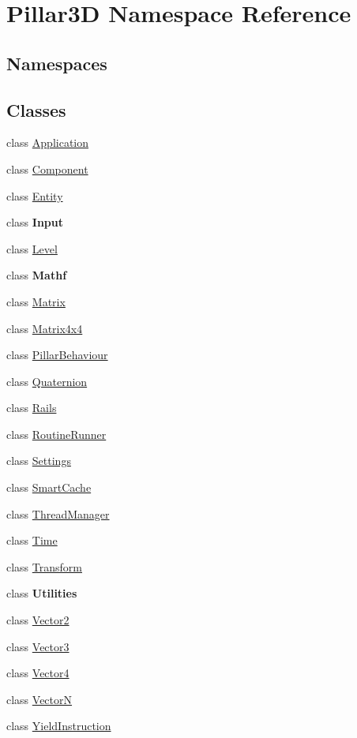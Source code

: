 \hypertarget{namespace_pillar3_d}{}\section{Pillar3D Namespace Reference}
\label{namespace_pillar3_d}
\subsection*{Namespaces}
\begin{DoxyCompactItemize}
\end{DoxyCompactItemize}
\subsection*{Classes}
\begin{DoxyCompactItemize}
\item 
class \hyperlink{class_pillar3_d_1_1_application}{Application}
\item 
class \hyperlink{class_pillar3_d_1_1_component}{Component}
\item 
class \hyperlink{class_pillar3_d_1_1_entity}{Entity}
\item 
class {\bfseries Input}
\item 
class \hyperlink{class_pillar3_d_1_1_level}{Level}
\item 
class {\bfseries Mathf}
\item 
class \hyperlink{class_pillar3_d_1_1_matrix}{Matrix}
\item 
class \hyperlink{class_pillar3_d_1_1_matrix4x4}{Matrix4x4}
\item 
class \hyperlink{class_pillar3_d_1_1_pillar_behaviour}{Pillar\+Behaviour}
\item 
class \hyperlink{class_pillar3_d_1_1_quaternion}{Quaternion}
\item 
class \hyperlink{class_pillar3_d_1_1_rails}{Rails}
\item 
class \hyperlink{class_pillar3_d_1_1_routine_runner}{Routine\+Runner}
\item 
class \hyperlink{class_pillar3_d_1_1_settings}{Settings}
\item 
class \hyperlink{class_pillar3_d_1_1_smart_cache}{Smart\+Cache}
\item 
class \hyperlink{class_pillar3_d_1_1_thread_manager}{Thread\+Manager}
\item 
class \hyperlink{class_pillar3_d_1_1_time}{Time}
\item 
class \hyperlink{class_pillar3_d_1_1_transform}{Transform}
\item 
class {\bfseries Utilities}
\item 
class \hyperlink{class_pillar3_d_1_1_vector2}{Vector2}
\item 
class \hyperlink{class_pillar3_d_1_1_vector3}{Vector3}
\item 
class \hyperlink{class_pillar3_d_1_1_vector4}{Vector4}
\item 
class \hyperlink{class_pillar3_d_1_1_vector_n}{VectorN}
\item 
class \hyperlink{class_pillar3_d_1_1_yield_instruction}{Yield\+Instruction}
\end{DoxyCompactItemize}
